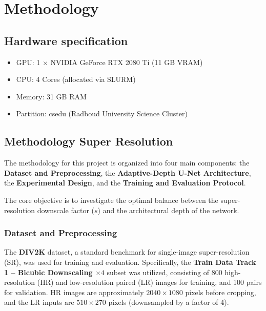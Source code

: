 \chapter{Methodology}\label{methodology}

\section{Hardware specification}

\begin{itemize}
    \item GPU: 1 $\times$ NVIDIA GeForce RTX 2080 Ti (11 GB VRAM)
    \item CPU: 4 Cores (allocated via SLURM)
    \item Memory: 31 GB RAM
    \item Partition: csedu (Radboud University Science Cluster) 
\end{itemize}

\section{Methodology Super Resolution}
\label{sec:methodology}






The methodology for this project is organized into four main components: the \textbf{Dataset and Preprocessing}, the \textbf{Adaptive-Depth U-Net Architecture}, the \textbf{Experimental Design}, and the \textbf{Training and Evaluation Protocol}. 

The core objective is to investigate the optimal balance between the super-resolution downscale factor ($s$) and the architectural depth of the network.

\subsection{Dataset and Preprocessing}
\label{subsec:data}

The \textbf{DIV2K} dataset, a standard benchmark for single-image super-resolution (SR), was used for training and evaluation. Specifically, the \textbf{Train Data Track 1 – Bicubic Downscaling $\times 4$} subset was utilized, consisting of 800 high-resolution (HR) and low-resolution paired (LR) images for training, and 100 pairs for validation. HR images are approximately $2040 \times 1080$ pixels before cropping, and the LR inputs are $510 \times 270$ pixels (downsampled by a factor of 4).

